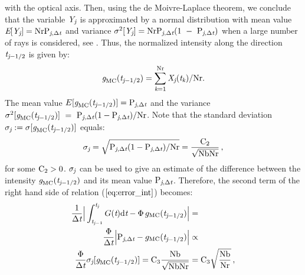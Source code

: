  with the optical axis. Then, using the de Moivre-Laplace theorem, we conclude that the variable $\textit{Y}_{\textit{j}}$ is approximated by a normal distribution with mean value 
$\textit{E}[\textit{Y}_{\textit{j}}] = \textrm{Nr}\textrm{P}_{\textit{j}, \Delta\textit{t}}$ and variance $\sigma^2[\textit{Y}_{\textit{j}}] = \textrm{Nr}\textrm{P}_{\textit{j}, \Delta\textit{t}}(1~-~\textrm{P}_{\textit{j}, \Delta\textit{t}})$ 
when a large number of rays is considered, see \cite{Rubinstein, deMoivre}.
Thus, the normalized intensity along the direction $\textit{t}_{\textit{j}-1/2}$ is given by:
\begin{equation}\textit{g}_{\textrm{MC}}(\textit{t}_{\textit{j}-1/2}) = \sum_{\textit{k}=1}^{\textrm{Nr}}\textit{X}_{\textit{j}}(\textit{t}_{\textit{k}})/\textrm{Nr}.\end{equation}
The mean value $E[\textit{g}_{\textrm{MC}}(\textit{t}_{\textit{j}-1/2})]=\textrm{P}_{\textit{j}, \Delta\textit{t}}$
and the variance $\sigma^2[\textit{g}_{\textrm{MC}}(\textit{t}_{\textit{j}-1/2})] ~=~ \textrm{P}_{\textit{j}, \Delta\textit{t}}(1-\textrm{P}_{\textit{j}, \Delta\textit{t}})/\textrm{Nr}$.
Note that the standard deviation $\sigma_{\textit{j}}:=\sigma[\textit{g}_{\textrm{MC}}(\textit{t}_{\textit{j}-1/2})]$ equals:
\begin{equation}\label{sigma}
\sigma_{\textit{j}}= \sqrt{\textrm{P}_{\textit{j}, \Delta\textit{t}}(1-\textrm{P}_{\textit{j}, \Delta\textit{t}})/\textrm{Nr}}= \frac{\textrm{C}_2}{\sqrt{\textrm{Nb}\textrm{Nr}}}\,, \end{equation}
 for some $\textrm{C}_{2}>0$. $\sigma_{\textit{j}}$ can be used to give an estimate of the difference between the intensity $\textit{g}_{\textrm{MC}}(\textit{t}_{\textit{j}-1/2})$ and its mean value $\textrm{P}_{\textit{j}, \Delta\textit{t}}$.
Therefore, the second term of the right hand side of relation ($\ref{eq:error_int}$) becomes:
\begin{equation}\begin{aligned}
\frac{1}{\Delta \textit{t}}\Big|\int_{\textit{t}_{\textit{j}-1}}^{\textit{t}_{\textit{j}}} G(\textit{t})\textrm{d}\textit{t} -
\Phi\, g_{\textrm{MC}}(\textit{t}_{\textit{j}-1/2})\Big| &=  \\
\frac{\Phi}{\Delta \textit{t}}\Big|\textrm{P}_{\textit{j}, \Delta\textit{t}} -g_{\textrm{MC}}(\textit{t}_{\textit{j}-1/2})\Big| &\propto  \\
  \frac{\Phi}{\Delta \textit{t}}
\sigma_{\textit{j}}[\textit{g}_{\textrm{MC}}(\textit{t}_{\textit{j}-1/2})]=\textrm{C}_3\frac{\textrm{Nb}}{\sqrt{\textrm{Nb}\textrm{Nr}}} & = \textrm{C}_3\sqrt{\frac{\textrm{Nb}}{\textrm{Nr}}}\,,
\end{aligned}
\end{equation}
